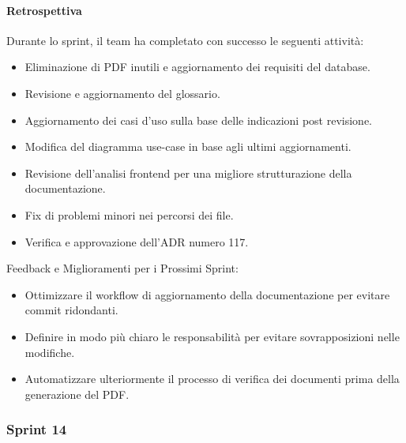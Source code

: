 \documentclass{article}
\begin{document}
                \paragraph{Retrospettiva}
                Durante lo sprint, il team ha completato con successo le seguenti attività:
                \begin{itemize}
                    \item Eliminazione di PDF inutili e aggiornamento dei requisiti del database.
                    \item Revisione e aggiornamento del glossario.
                    \item Aggiornamento dei casi d'uso sulla base delle indicazioni post revisione.
                    \item Modifica del diagramma use-case in base agli ultimi aggiornamenti.
                    \item Revisione dell'analisi frontend per una migliore strutturazione della documentazione.
                    \item Fix di problemi minori nei percorsi dei file.
                    \item Verifica e approvazione dell'ADR numero 117.
                \end{itemize}
                
                Feedback e Miglioramenti per i Prossimi Sprint:
                \begin{itemize}
                    \item Ottimizzare il workflow di aggiornamento della documentazione per evitare commit ridondanti.
                    \item Definire in modo più chiaro le responsabilità per evitare sovrapposizioni nelle modifiche.
                    \item Automatizzare ulteriormente il processo di verifica dei documenti prima della generazione del PDF.
                \end{itemize}
            \subsubsection{Sprint 14}
\end{document}
